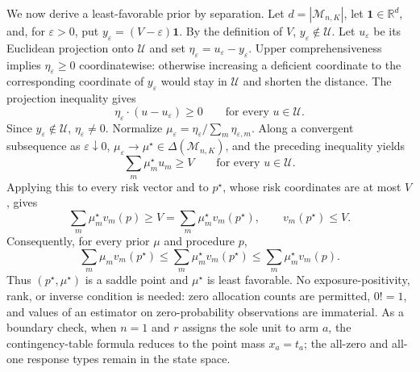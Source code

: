 We now derive a least-favorable prior by separation.  Let \(d=|\mathcal M_{n,K}|\), let \(\mathbf 1\in\mathbb R^d\), and, for \(\varepsilon>0\), put \(y_\varepsilon=(V-\varepsilon)\mathbf 1\).  By the definition of \(V\), \(y_\varepsilon\notin\mathcal U\).  Let \(u_\varepsilon\) be its Euclidean projection onto \(\mathcal U\) and set \(\eta_\varepsilon=u_\varepsilon-y_\varepsilon\).  Upper comprehensiveness implies \(\eta_\varepsilon\ge0\) coordinatewise: otherwise increasing a deficient coordinate to the corresponding coordinate of \(y_\varepsilon\) would stay in \(\mathcal U\) and shorten the distance.  The projection inequality gives
\[
 \eta_\varepsilon\mathbin{\cdot}(u-u_\varepsilon)\ge0
 \qquad\text{for every }u\in\mathcal U.
\]
Since \(y_\varepsilon\notin\mathcal U\), \(\eta_\varepsilon\ne0\).  Normalize
\(\mu_\varepsilon=\eta_\varepsilon/\sum_m\eta_{\varepsilon,m}\).  Along a convergent subsequence as \(\varepsilon\downarrow0\), \(\mu_\varepsilon\to\mu^\star\in\Delta(\mathcal M_{n,K})\), and the preceding inequality yields
\[
 \sum_m\mu_m^\star u_m\ge V
 \qquad\text{for every }u\in\mathcal U.
\]
Applying this to every risk vector and to \(p^\star\), whose risk coordinates are at most \(V\), gives
\[
 \sum_m\mu_m^\star v_m(p)\ge V
 =\sum_m\mu_m^\star v_m(p^\star),
 \qquad v_m(p^\star)\le V.
\]
Consequently, for every prior \(\mu\) and procedure \(p\),
\[
 \sum_m\mu_m v_m(p^\star)
 \le\sum_m\mu_m^\star v_m(p^\star)
 \le\sum_m\mu_m^\star v_m(p).
\]
Thus \((p^\star,\mu^\star)\) is a saddle point and \(\mu^\star\) is least favorable.  No exposure-positivity, rank, or inverse condition is needed: zero allocation counts are permitted, \(0!=1\), and values of an estimator on zero-probability observations are immaterial.  As a boundary check, when \(n=1\) and \(r\) assigns the sole unit to arm \(a\), the contingency-table formula reduces to the point mass \(x_a=t_a\); the all-zero and all-one response types remain in the state space.